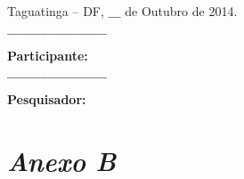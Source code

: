 		{\flushright  Taguatinga – DF, $\_\_\_$ de Outubro de 2014.}

		\begin{center}
			$\_\_\_\_\_\_\_\_\_\_\_\_\_\_\_\_\_\_\_\_\_\_\_\_$
			
			\textbf{Participante:}

			$\_\_\_\_\_\_\_\_\_\_\_\_\_\_\_\_\_\_\_\_\_\_\_\_$
			
			\textbf{Pesquisador:}
		\end{center}


	\section[Anexo B]{\emph{Anexo B}}
	\label{sec:anexoB}

		\begin{table}[h]
			\centering
			\begin{tabular}{|p{14cm}|}
				

\end{tabular}
\end{table}
